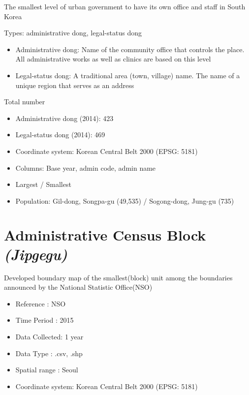 \documentclass[]{book}
\providecommand{\tightlist}{%
  \setlength{\itemsep}{0pt}\setlength{\parskip}{0pt}}
\begin{document}
The smallest level of urban government to have its own office and staff
in South Korea

Types: administrative dong, legal-status dong

\begin{itemize}
\tightlist
\item
  Administrative dong: Name of the community office that controls the
  place. All administrative works as well as clinics are based on this
  level
\item
  Legal-status dong: A traditional area (town, village) name. The name
  of a unique region that serves as an address
\end{itemize}

Total number

\begin{itemize}
\tightlist
\item
  Administrative dong (2014): 423
\item
  Legal-status dong (2014): 469
\item
  Coordinate system: Korean Central Belt 2000 (EPSG: 5181)
\item
  Columns: Base year, admin code, admin name
\item
  Largest / Smallest
\item
  Population: Gil-dong, Songpa-gu (49,535) / Sogong-dong, Jung-gu (735)
\end{itemize}

\section{\texorpdfstring{Administrative Census Block
\emph{(Jipgegu)}}{Administrative Census Block (Jipgegu)}}\label{administrative-census-block-jipgegu}

Developed boundary map of the smallest(block) unit among the boundaries
announced by the National Statistic Office(NSO)

\begin{itemize}
\tightlist
\item
  Reference : NSO
\item
  Time Period : 2015
\item
  Data Collected: 1 year
\item
  Data Type : .csv, .shp
\item
  Spatial range : Seoul
\item
  Coordinate system: Korean Central Belt 2000 (EPSG: 5181)
\end{itemize}
\end{document}
